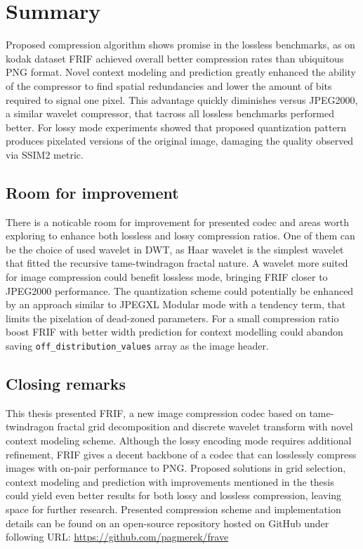 \section{Summary}

Proposed compression algorithm shows promise in the lossless benchmarks, as on kodak dataset FRIF achieved overall better
compression rates than ubiquitous PNG format. Novel context modeling and prediction greatly enhanced the ability of the compressor to find spatial redundancies
and lower the amount of bits required to signal one pixel. This advantage quickly diminishes versus JPEG2000, a similar wavelet compressor, that
tacross all lossless benchmarks performed better. 
For lossy mode experiments showed that proposed quantization pattern produces pixelated versions of the original image, damaging the quality observed
via SSIM2 metric.

\subsection{Room for improvement}
There is a noticable room for improvement for presented codec and areas worth exploring to enhance both lossless and lossy compression ratios. 
One of them can be the choice of used wavelet in DWT, as Haar wavelet is the simplest wavelet that fitted the recursive tame-twindragon fractal nature. 
A wavelet more suited for image compression could benefit lossless mode, bringing FRIF closer to JPEG2000 performance.
The quantization scheme could potentially be enhanced by an approach similar to JPEGXL Modular mode with a tendency term, that limits the pixelation of dead-zoned
parameters. For a small compression ratio boost FRIF with better width prediction for context modelling could abandon saving \texttt{off\_distribution\_values} array as the image header.

\subsection{Closing remarks}
This thesis presented FRIF, a new image compression codec based on tame-twindragon fractal grid decomposition and discrete wavelet transform
with novel context modeling scheme. Although the lossy encoding mode requires additional refinement, FRIF gives a decent backbone of a codec that
can losslessly compress images with on-pair performance to PNG. Proposed solutions in grid selection, context modeling and prediction
with improvements mentioned in the thesis could yield even better results for both lossy and lossless compression, leaving space for further research. 
Presented compression scheme and implementation details can be found on an open-source repository hosted on GitHub under following URL: \url{https://github.com/pagmerek/frave}
